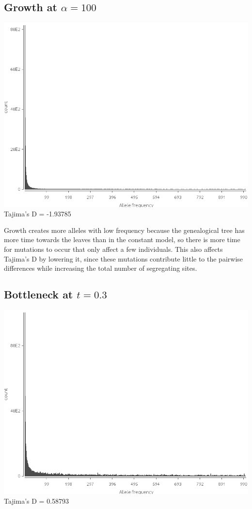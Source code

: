 \documentclass{article}
\begin{document}
\subsection{Growth at $\alpha = 100$}
\includegraphics[width=\textwidth]{growth}
Tajima's D = -1.93785

Growth creates more alleles with low frequency because the genealogical tree has
more time towards the leaves than in the constant model, so there is more time
for mutations to occur that only affect a few individuals.  This also affects
Tajima's D by lowering it, since these mutations contribute little to the
pairwise differences while increasing the total number of segregating sites.
\subsection{Bottleneck at $t=0.3$}
\includegraphics[width=\textwidth]{bottleneck}
Tajima's D = 0.58793
\end{document}
